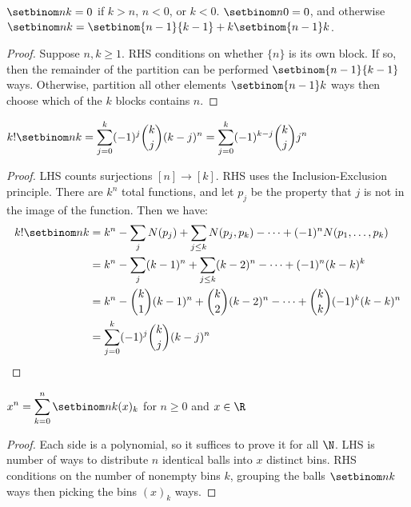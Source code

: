 \documentclass[a4paper]{article}
\begin{document}
\begin{theorem}\label{setbinom_recurse}
$\setbinom nk=0$ if $k>n$, $n<0$, or $k<0$. $\setbinom n0=0$, and otherwise $\setbinom nk=\setbinom{n-1}{k-1}+k\setbinom{n-1}k$.

\begin{hl}
\begin{proof}
Suppose $n,k\geq1$. RHS conditions on whether $\{n\}$ is its own block. If so, then the remainder of the partition can be performed $\setbinom{n-1}{k-1}$ ways. Otherwise, partition all other elements $\setbinom{n-1}k$ ways then choose which of the $k$ blocks contains $n$.
\end{proof}
\end{hl}
\end{theorem}

\begin{theorem}
$\displaystyle k!\setbinom nk
=\sum_{j=0}^k(-1)^j\binom kj(k-j)^n
=\sum_{j=0}^k(-1)^{k-j}\binom kjj^n$

\begin{hl}
\begin{proof}
LHS counts surjections $[n]\rightarrow[k]$. RHS uses the Inclusion-Exclusion principle. There are $k^n$ total functions, and let $p_j$ be the property that $j$ is not in the image of the function. Then we have:
\begin{align*}
k!\setbinom nk
&=k^n-\sum_jN(p_j)+\sum_{j\leq k}N(p_j,p_k)-\cdots+(-1)^nN(p_1,\dots,p_k)\\
&=k^n-\sum_j(k-1)^n+\sum_{j\leq k}(k-2)^n-\cdots+(-1)^n(k-k)^k\\
&=k^n-\binom k1(k-1)^n+\binom k2(k-2)^n-\cdots+\binom kk(-1)^k(k-k)^n\\
&=\sum_{j=0}^k(-1)^j\binom kj(k-j)^n\qedhere
\end{align*}
\end{proof}
\end{hl}
\end{theorem}

\begin{theorem}\label{monomial_as_falling}
$\displaystyle x^n=\sum_{k=0}^n\setbinom nk(x)_k$ for $n\geq0$ and $x\in\R$

\begin{hl}
\begin{proof}
Each side is a polynomial, so it suffices to prove it for all $\N$. LHS is number of ways to distribute $n$ identical balls into $x$ distinct bins. RHS conditions on the number of nonempty bins $k$, grouping the balls $\setbinom nk$ ways then picking the bins $(x)_k$ ways.
\end{proof}
\end{hl}
\end{theorem}
\end{document}
